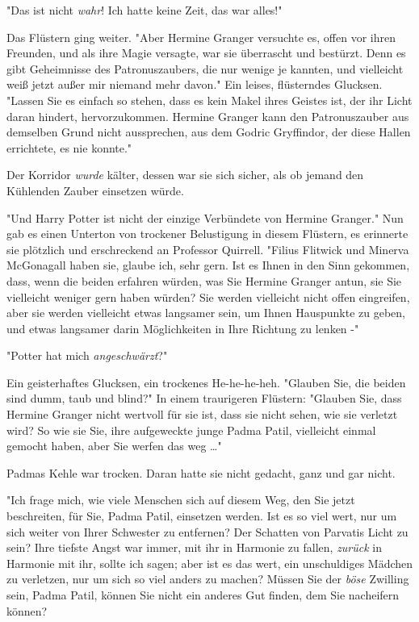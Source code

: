 {"Das ist nicht \emph{wahr}! Ich hatte keine Zeit, das war alles!"

Das Flüstern ging weiter. "Aber Hermine Granger versuchte es, offen vor ihren Freunden, und als ihre Magie versagte, war sie überrascht und bestürzt. Denn es gibt Geheimnisse des Patronuszaubers, die nur wenige je kannten, und vielleicht weiß jetzt außer mir niemand mehr davon." Ein leises, flüsterndes Glucksen. "Lassen Sie es einfach so stehen, dass es kein Makel ihres Geistes ist, der ihr Licht daran hindert, hervorzukommen. Hermine Granger kann den Patronuszauber aus demselben Grund nicht aussprechen, aus dem Godric Gryffindor, der diese Hallen errichtete, es nie konnte."

Der Korridor \emph{wurde} kälter, dessen war sie sich sicher, als ob jemand den Kühlenden Zauber einsetzen würde.

"Und Harry Potter ist nicht der einzige Verbündete von Hermine Granger." Nun gab es einen Unterton von trockener Belustigung in diesem Flüstern, es erinnerte sie plötzlich und erschreckend an Professor Quirrell. "Filius Flitwick und Minerva McGonagall haben sie, glaube ich, sehr gern. Ist es Ihnen in den Sinn gekommen, dass, wenn die beiden erfahren würden, was Sie Hermine Granger antun, sie Sie vielleicht weniger gern haben würden? Sie werden vielleicht nicht offen eingreifen, aber sie werden vielleicht etwas langsamer sein, um Ihnen Hauspunkte zu geben, und etwas langsamer darin Möglichkeiten in Ihre Richtung zu lenken -"

"Potter hat mich \emph{angeschwärzt}?"

Ein geisterhaftes Glucksen, ein trockenes He-he-he-heh. "Glauben Sie, die beiden sind dumm, taub und blind?" In einem traurigeren Flüstern: "Glauben Sie, dass Hermine Granger nicht wertvoll für sie ist, dass sie nicht sehen, wie sie verletzt wird? So wie sie Sie, ihre aufgeweckte junge Padma Patil, vielleicht einmal gemocht haben, aber Sie werfen das weg …"

Padmas Kehle war trocken. Daran hatte sie nicht gedacht, ganz und gar nicht.

"Ich frage mich, wie viele Menschen sich auf diesem Weg, den Sie jetzt beschreiten, für Sie, Padma Patil, einsetzen werden. Ist es so viel wert, nur um sich weiter von Ihrer Schwester zu entfernen? Der Schatten von Parvatis Licht zu sein? Ihre tiefste Angst war immer, mit ihr in Harmonie zu fallen, \emph{zurück} in Harmonie mit ihr, sollte ich sagen; aber ist es das wert, ein unschuldiges Mädchen zu verletzen, nur um sich so viel anders zu machen? Müssen Sie der \emph{böse} Zwilling sein, Padma Patil, können Sie nicht ein anderes Gut finden, dem Sie nacheifern können?

}
